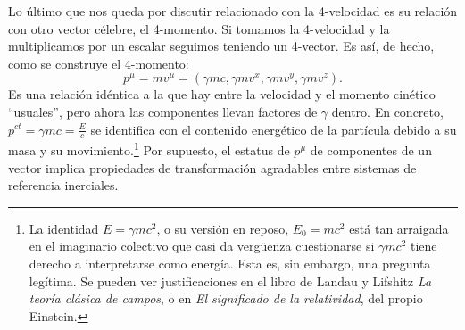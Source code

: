 Lo último que nos queda por discutir relacionado con la 4-velocidad es su relación con otro vector célebre, el 4-momento. Si tomamos la 4-velocidad y la multiplicamos por un escalar seguimos teniendo un 4-vector. Es así, de hecho, como se construye el 4-momento:
\begin{equation}
    \label{eq.1-4momento}
    p^\mu = m v^\mu = (\gamma m c, \gamma m v^x, \gamma m v^y, \gamma m v^z).
\end{equation}
Es una relación idéntica a la que hay entre la velocidad y el momento cinético ``usuales'', pero ahora las componentes llevan factores de \(\gamma\) dentro. En concreto, \(p^{ct} = \gamma mc = \frac{E}{c}\) se identifica con el contenido energético de la partícula debido a su masa y su movimiento.\footnote{La identidad \(E = \gamma mc^2\), o su versión en reposo, \(E_0=mc^2\) está tan arraigada en el imaginario colectivo que casi da vergüenza cuestionarse si \(\gamma mc^2\) tiene derecho a interpretarse como energía. Esta es, sin embargo, una pregunta legítima. Se pueden ver justificaciones en el libro de Landau y Lifshitz \textit{La teoría clásica de campos}, o en \textit{El significado de la relatividad}, del propio Einstein.} Por supuesto, el estatus de \(p^\mu\) de componentes de un vector implica propiedades de transformación agradables entre sistemas de referencia inerciales. 

